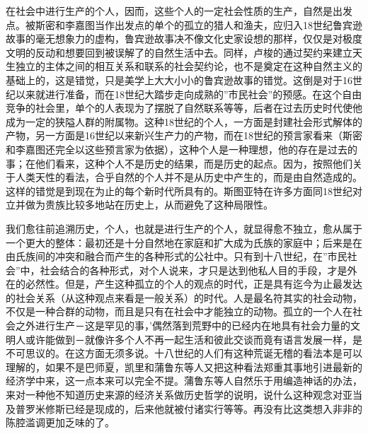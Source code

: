 \documentclass[a4paper,twoside,12pt,AutoFakeBold]{ctexart}
\begin{document}
在社会中进行生产的个人，因而，这些个人的一定社会性质的生产，自然是出发点。被斯密和李嘉图当作出发点的单个的孤立的猎人和渔夫，应归入18世纪鲁宾逊故事的毫无想象力的虚构，鲁宾逊故事决不像文化史家设想的那样，仅仅是对极度文明的反动和想要回到被误解了的自然生活中去。同样，卢梭的通过契约来建立天生独立的主体之间的相互关系和联系的社会契约论，也不是奠定在这种自然主义的基础上的，这是错觉，只是美学上大大小小的鲁宾逊故事的错觉。这倒是对于16世纪以来就进行准备，而在18世纪大踏步走向成熟的”市民社会”的预感。在这个自由竞争的社会里，单个的人表现为了摆脱了自然联系等等，后者在过去历史时代使他成为一定的狭隘人群的附属物。这种18世纪的个人，一方面是封建社会形式解体的产物，另一方面是16世纪以来新兴生产力的产物，而在18世纪的预言家看来（斯密和李嘉图还完全以这些预言家为依据），这种个人是一种理想，他的存在是过去的事；在他们看来，这种个人不是历史的结果，而是历史的起点。因为，按照他们关于人类天性的看法，合乎自然的个人并不是从历史中产生的，而是由自然造成的。这样的错觉是到现在为止的每个新时代所具有的。斯图亚特在许多方面同18世纪对立并做为贵族比较多地站在历史上，从而避免了这种局限性。

我们愈往前追溯历史，个人，也就是进行生产的个人，就显得愈不独立，愈从属于一个更大的整体：最初还是十分自然地在家庭和扩大成为氏族的家庭中；后来是在由氏族间的冲突和融合而产生的各种形式的公社中。只有到十八世纪，在”市民社会”中，社会结合的各种形式，对个人说来，才只是达到他私人目的手段，才是外在的必然性。但是，产生这种孤立的个人的观点的时代，正是具有迄今为止最发达的社会关系（从这种观点来看是一般关系）的时代。人是最名符其实的社会动物，不仅是一种合群的动物，而且是只有在社会中才能独立的动物。孤立的一个人在社会之外进行生产－这是罕见的事，’偶然落到荒野中的已经内在地具有社会力量的文明人或许能做到－就像许多个人不再一起生活和彼此交谈而竟有语言发展一样，是不可思议的。在这方面无须多说。十八世纪的人们有这种荒诞无稽的看法本是可以理解的，如果不是巴师夏，凯里和蒲鲁东等人又把这种看法郑重其事地引进最新的经济学中来，这一点本来可以完全不提。蒲鲁东等人自然乐于用编造神话的办法，来对一种他不知道历史来源的经济关系做历史哲学的说明，说什么这种观念对亚当及普罗米修斯已经是现成的，后来他就被付诸实行等等。再没有比这类想入非非的陈腔滥调更加乏味的了。
\end{document}

